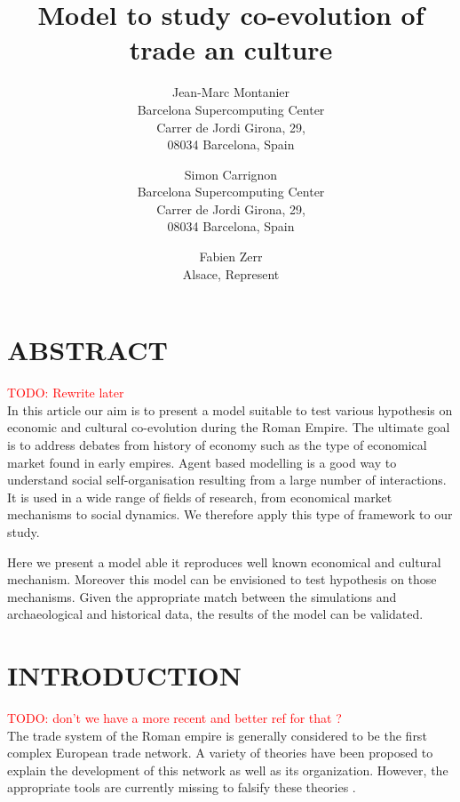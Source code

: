 \documentclass{wscpaperproc}
\newcommand{\memo}[2]{\textcolor{#1}{#2}}
\newcommand{\todo}[1]{\memo{red}{TODO: #1\\}}
\begin{document}

\title{Model to study co-evolution of trade an culture}

\author{Jean-Marc Montanier\\ [12pt]
Barcelona Supercomputing Center\\
Carrer de Jordi Girona, 29, \\
08034 Barcelona, Spain\\
\and
Simon Carrignon\\ [12pt]
Barcelona Supercomputing Center\\
Carrer de Jordi Girona, 29, \\
08034 Barcelona, Spain\\
\and
Fabien Zerr\\ [12pt]
Alsace, Represent
}






\maketitle


\section*{ABSTRACT}

\todo{Rewrite later}
In this article our aim is to present a model suitable to test various hypothesis on economic and cultural co-evolution during the Roman Empire. The ultimate goal is to address debates from history of economy such as the type of economical market found in early empires. Agent based modelling is a good way to understand social self-organisation resulting from a large number of interactions. It is used in a wide range of fields of research, from economical market mechanisms to social dynamics. We therefore apply this type of framework to our study.

Here we present a model able it reproduces well known economical and cultural mechanism. Moreover this model can be envisioned to test hypothesis on those mechanisms. Given the appropriate match between the simulations and archaeological and historical data, the results of the model can be validated.


\section{INTRODUCTION}

\todo{don't we have a more recent and better ref for that ?}
The trade system of the Roman empire is generally considered to be the first complex European trade network. A variety of theories have been proposed to explain the development of this network as well as its organization. However, the appropriate tools are currently missing to falsify these theories  \cite{garnsey_trade_1983}. 
\end{document}
